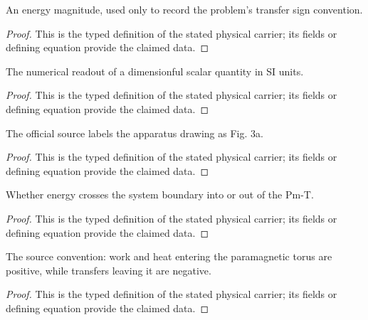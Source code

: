 \begin{definition}
  \label{def:physics:IPhO_2026_3_A_1:aux008}
  An energy magnitude, used only to record the problem's transfer sign convention.
\end{definition}
\begin{proof}
  This is the typed definition of the stated physical carrier; its fields or defining equation provide the claimed data.
\end{proof}

\begin{definition}
  \label{def:physics:IPhO_2026_3_A_1:aux009}
  The numerical readout of a dimensionful scalar quantity in SI units.
\end{definition}
\begin{proof}
  This is the typed definition of the stated physical carrier; its fields or defining equation provide the claimed data.
\end{proof}

\begin{definition}
  \label{def:physics:IPhO_2026_3_A_1:aux010}
  The official source labels the apparatus drawing as Fig. 3a.
\end{definition}
\begin{proof}
  This is the typed definition of the stated physical carrier; its fields or defining equation provide the claimed data.
\end{proof}

\begin{definition}
  \label{def:physics:IPhO_2026_3_A_1:aux011}
  Whether energy crosses the system boundary into or out of the Pm-T.
\end{definition}
\begin{proof}
  This is the typed definition of the stated physical carrier; its fields or defining equation provide the claimed data.
\end{proof}

\begin{definition}
  \label{def:physics:IPhO_2026_3_A_1:aux012}
  The source convention: work and heat entering the paramagnetic torus are positive, while transfers leaving it are negative.
\end{definition}
\begin{proof}
  This is the typed definition of the stated physical carrier; its fields or defining equation provide the claimed data.
\end{proof}

